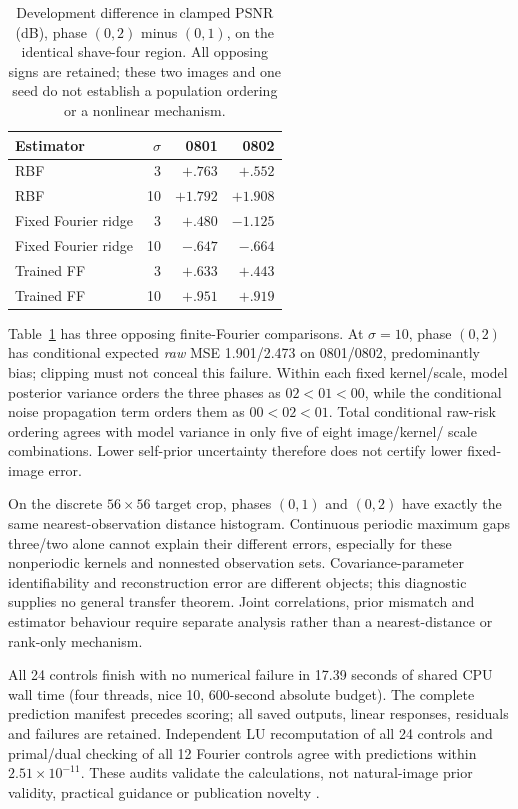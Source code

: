 \begin{table}[t]
\centering\small
\begin{tabular}{lrrr}
\toprule
Estimator & $\sigma$ & 0801 & 0802 \\
\midrule
RBF & 3 & $+.763$ & $+.552$ \\
RBF & 10 & $+1.792$ & $+1.908$ \\
Fixed Fourier ridge & 3 & $+.480$ & $-1.125$ \\
Fixed Fourier ridge & 10 & $-.647$ & $-.664$ \\
Trained FF & 3 & $+.633$ & $+.443$ \\
Trained FF & 10 & $+.951$ & $+.919$ \\
\bottomrule
\end{tabular}
\caption{Development difference in clamped PSNR (dB), phase $(0,2)$ minus
$(0,1)$, on the identical shave-four region. All opposing signs are
retained; these two images and one seed do not establish a population
ordering or a nonlinear mechanism.}\label{tab:controls}
\end{table}

Table~\ref{tab:controls} has three opposing finite-Fourier comparisons.
At $\sigma=10$, phase $(0,2)$ has conditional expected \emph{raw} MSE
1.901/2.473 on 0801/0802, predominantly bias; clipping must not conceal
this failure. Within each fixed kernel/scale, model posterior variance
orders the three phases as $02<01<00$, while the conditional noise
propagation term orders them as $00<02<01$. Total conditional raw-risk
ordering agrees with model variance in only five of eight image/kernel/
scale combinations. Lower self-prior uncertainty therefore does not
certify lower fixed-image error.

On the discrete $56\times56$ target crop, phases $(0,1)$ and $(0,2)$
have exactly the same nearest-observation distance histogram. Continuous
periodic maximum gaps three/two alone cannot explain their different
errors, especially for these nonperiodic kernels and nonnested observation
sets. Covariance-parameter identifiability and reconstruction error are
different objects; this diagnostic supplies no general transfer theorem.
Joint correlations, prior mismatch and estimator behaviour require
separate analysis rather than a nearest-distance or rank-only mechanism.

All 24 controls finish with no numerical failure in 17.39 seconds of
shared CPU wall time (four threads, nice 10, 600-second absolute budget).
The complete prediction manifest precedes scoring; all saved outputs,
linear responses, residuals and failures are retained. Independent LU
recomputation of all 24 controls and primal/dual checking of all 12
Fourier controls agree with predictions within $2.51\times10^{-11}$.
These audits validate the calculations, not natural-image prior validity,
practical guidance or publication novelty .

